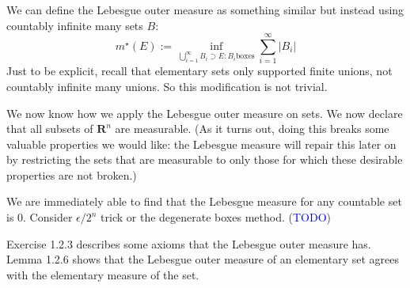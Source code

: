 \documentclass[answers,12pt]{exam}
\begin{document}
We can define the Lebesgue outer measure as something similar but instead using countably infinite many sets $B$:
\[m^{\star}(E):=\inf_{\bigcup_{i=1}^{\infty} B_i \supset E: B_i \text{boxes}} \sum_{i=1}^{\infty}|B_i|\]
Just to be explicit, recall that elementary sets only supported finite unions, not countably infinite many unions.
So this modification is not trivial.

We now know how we apply the Lebesgue outer measure on sets.
We now declare that all subsets of $\mathbf{R}^n$ are measurable.
(As it turns out, doing this breaks some valuable properties we would like: the Lebesgue measure will repair this later on by restricting the sets that are measurable to only those for which these desirable properties are not broken.)

We are immediately able to find that the Lebesgue measure for any countable set is 0.
Consider $\epsilon/2^n$ trick or the degenerate boxes method. 
(\textcolor{blue}{TODO})

Exercise 1.2.3 describes some axioms that the Lebesgue outer measure has.
Lemma 1.2.6 shows that the Lebesgue outer measure of an elementary set agrees with the elementary measure of the set.
\end{document}

